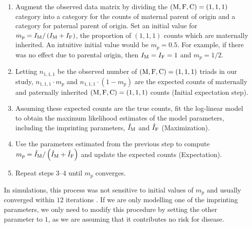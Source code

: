 \begin{enumerate}
    \item Augment the observed data matrix by dividing the $({\rm M}, {\rm F}, {\rm C}) = (1,1,1)$ category into a category for the counts of maternal parent of origin and a category for paternal parent of origin.  Set an initial value for $m_p = I_{{\rm M}}/\left(I_{{\rm M}} + I_{{\rm F}}\right)$, the proportion of $(1, 1, 1)$ counts which are maternally inherited.  An intuitive initial value would be $m_p = 0.5$.  For example, if there was no effect due to parental origin, then $I_{{\rm M}} = I_{{\rm F}} = 1$ and $m_p = 1/2$.
    \item Letting $n_{1,1,1}$ be the observed number of $({\rm M},{\rm F},{\rm C}) = (1,1,1)$ triads in our study, $n_{1,1,1}\cdot m_p$ and $n_{1,1,1}\cdot (1 - m_p)$ are the expected counts of maternally and paternally inherited $({\rm M}, {\rm F}, {\rm C}) = (1, 1, 1)$ counts (Initial expectation step).
    \item Assuming these expected counts are the true counts, fit the log-linear model to obtain the maximum likelihood estimates of the model parameters, including the imprinting parameters, $\hat{I}_{{\rm M}}$ and $\hat{I}_{{\rm F}}$ (Maximization).
    \item Use the parameters estimated from the previous step to compute $m_p = \hat{I}_{{\rm M}}/\left(\hat{I}_{{\rm M}} + \hat{I}_{{\rm F}}\right)$ and update the expected counts (Expectation).
    \item Repeat steps 3--4 until $m_p$ converges.
\end{enumerate}
In simulations, this process was not sensitive to initial values of $m_p$ and usually converged within $12$ iterations \cite{Wein+98}.
If we are only modelling one of the imprinting parameters, we only need to modify this procedure by setting the other parameter to $1$, as we are assuming that it contributes no risk for disease.


